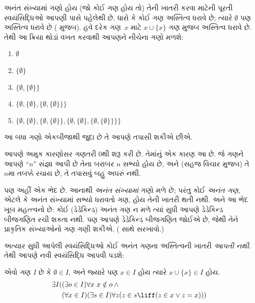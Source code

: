 \documentclass[../../../include/open-logic-section]{subfiles}
\begin{document}

અનંત સંખ્યામાં ગણો હોય (જો કોઈ ગણ હોય તો) તેની ખાતરી કરવા માટેની
પૂરતી સ્વયંસિદ્ધિઓ આપણી પાસે પહેલેથી છે. ધારો કે કોઈ ગણ અસ્તિત્વ
ધરાવે છે; ત્યારે $\emptyset$ પણ અસ્તિત્વ ધરાવે છે
( મુજબ). હવે દરેક ગણ~$x$ માટે
$x \cup \{x\}$ ગણ  મુજબ
અસ્તિત્વ ધરાવે છે. તેથી આ ક્રિયા થોડાં વખત કરવાથી આપણને નીચેના ગણો
મળશે:
\begin{enumerate}
	\item[0.] $\emptyset$ %
	\item[1.] $ \{\emptyset\}$ %
	\item[2.] $\{\emptyset, \{\emptyset\}\}$ %
	\item[3.] $\{\emptyset, \{\emptyset\}, \{\emptyset, \{\emptyset\}\}\}$ %
	\item[4.] $\{\emptyset, \{\emptyset\}, \{\emptyset, \{\emptyset\}\}, \{\emptyset, \{\emptyset\}, \{\emptyset, \{\emptyset\}\}\}\}$%
\end{enumerate}
આ બધા ગણો એકબીજાથી જુદા છે તે આપણે તપાસી શકીએ છીએ.

આપણે અમુક કારણોસર ગણતરી $0$થી શરૂ કરી છે. તેમાંનું એક કારણ આ છે.
જે ગણને આપણે “$n$” સંજ્ઞા આપી છે તેના બરાબર $n$ સભ્યો હોય છે,
અને (સહજ વિચાર મુજબ) તે $n$મા તબક્કે રચાય છે, તે તપાસવું બહુ અઘરું
નથી.

પણ અહીં એક ભેદ છે. આનાથી \emph{અનંત સંખ્યામાં} ગણો મળે છે; પરંતુ
કોઈ \emph{અનંત ગણ}, એટલે કે અનંત સંખ્યામાં સભ્યો ધરાવતો ગણ, હોય
તેની ખાતરી થતી નથી. અને આ ભેદ ખૂબ મહત્ત્વનો છે: કોઈ
(ડેડેકિન્ડ) અનંત ગણ ન મળે ત્યાં સુધી આપણે ડેડેકિન્ડ બીજગણિત રચી
શકતા નથી. પણ આપણે ડેડેકિન્ડ બીજગણિત જોઈએ છે, જેથી તેને પ્રાકૃતિક
સંખ્યાઓનો ગણ ગણી શકીએ.
( સાથે સરખાવો.)

અત્યાર સુધી આપેલી સ્વયંસિદ્ધિઓ કોઈ અનંત ગણના અસ્તિત્વની ખાતરી
\emph{આપતી નથી}. તેથી આપણે નવી સ્વયંસિદ્ધિ આપવી પડશે:

\begin{axiom}[અનંતતા]
એવો ગણ $I$ છે કે $\emptyset \in I$, અને જ્યારે પણ $x \in I$ હોય
ત્યારે $x \cup \{x\} \in I$ હોય.
\begin{align*}
	\exists I( & (\exists o \in I)\forall x\ x \notin o \land {}\\
	& (\forall x \in I)(\exists s \in I)\forall z(z \in s \liff (z \in x \lor z = x)))
\end{align*}
\end{axiom}
\end{document}
